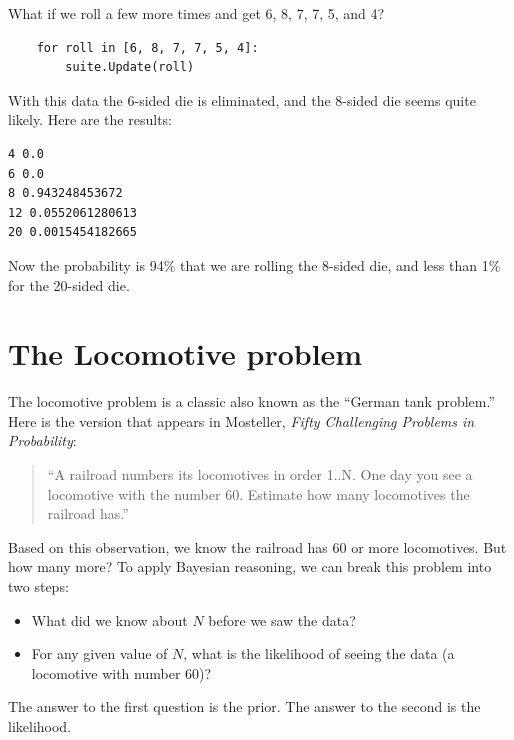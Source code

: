 \documentclass[12pt]{book}
\begin{document}
What if we roll a few more times and get 6, 8, 7, 7, 5, and 4?

\begin{verbatim}
    for roll in [6, 8, 7, 7, 5, 4]:
        suite.Update(roll)
\end{verbatim}

With this data the 6-sided die is eliminated, and the 8-sided
die seems quite likely.  Here are the results:

\begin{verbatim}
4 0.0
6 0.0
8 0.943248453672
12 0.0552061280613
20 0.0015454182665
\end{verbatim}

Now the probability is 94\% that we are rolling the 8-sided die,
and less than 1\% for the 20-sided die.


\section{The Locomotive problem}

The locomotive problem is a classic also
known as the ``German tank problem.''  Here is the version
that appears in Mosteller, {\it Fifty Challenging Problems in
  Probability}:

\begin{quote}
``A railroad numbers its locomotives in order 1..N.  One day you see a
locomotive with the number 60.  Estimate how many locomotives the
railroad has.''
\end{quote}

Based on this observation, we know the railroad has 60 or more
locomotives.  But how many more?  To apply Bayesian reasoning, we
can break this problem into two steps:

\begin{itemize}

\item What did we know about $N$ before we saw the data?

\item For any given value of $N$, what is the likelihood of
seeing the data (a locomotive with number 60)?

\end{itemize}

The answer to the first question is the prior.  The answer to the
second is the likelihood.
\end{document}
